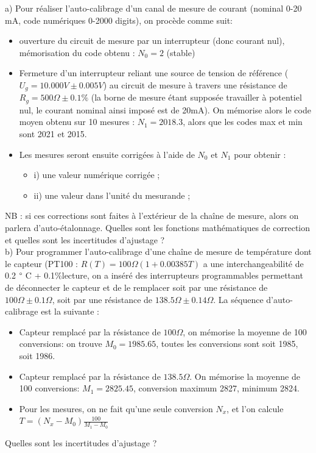 a)	Pour réaliser l'auto-calibrage d'un canal de mesure de courant (nominal 0-20 mA, code numériques 0-2000 digits), on procède comme suit:
\begin{itemize}
    \item ouverture du circuit de mesure par un interrupteur (donc courant nul), mémorisation du code obtenu :  $N_0=2$ (stable)
    \item Fermeture d'un interrupteur reliant une source de tension de référence ($U_g = 10.000V \pm 0.005V$) au circuit de mesure à travers une résistance de $R_g = 500 \Omega \pm 0.1\%$ (la borne de mesure étant supposée travailler à potentiel nul, le courant nominal ainsi imposé est de 20mA). On mémorise alors le code moyen obtenu sur 10 mesures : $N_1 = 2018.3$, alors que les codes max et min sont 2021 et 2015.
    \item Les mesures seront ensuite corrigées à l'aide de $N_0$ et $N_1$ pour obtenir :
          \begin{itemize}\itemsep1pt
                    \renewcommand{\labelitemi}{$\bullet$}
              \item i) une valeur numérique corrigée ;
              \item ii) une valeur dans l'unité du mesurande ;
          \end{itemize}
\end{itemize}
NB : si ces corrections sont faites à l'extérieur de la chaîne de mesure, alors on parlera d'auto-étalonnage.
Quelles sont les fonctions mathématiques de correction et quelles sont les incertitudes d'ajustage ?\\

b)	Pour programmer l'auto-calibrage d'une chaîne de mesure de température dont le capteur (PT100 : $R(T)=100 \Omega (1+0.00385T)$ a une interchangeabilité de 0.2 $\degree$ C + 0.1\%lecture, on a inséré des interrupteurs programmables permettant de déconnecter le capteur et de le remplacer soit par une résistance de$ 100 \Omega \pm 0.1 \Omega$, soit par une résistance de $138.5 \Omega \pm 0.14 \Omega$. La séquence d'auto-calibrage est la suivante :
\begin{itemize}
    \item Capteur remplacé par la résistance de $100 \Omega$, on mémorise la moyenne de 100 conversions: on trouve $M_0=1985.65$, toutes les conversions sont soit 1985, soit 1986.
    \item Capteur remplacé par la résistance de $138.5 \Omega$. On mémorise la moyenne de 100 conversions: $M_1=2825.45$, conversion maximum 2827, minimum 2824.
    \item Pour les mesures, on ne fait qu'une seule conversion $N_x$, et l'on calcule \\
          $T= (N_x - M_0)\frac{100}{M_1 - M_0}$
\end{itemize}
Quelles sont les incertitudes d'ajustage ? \\

